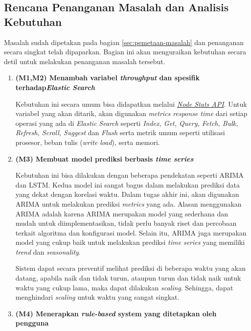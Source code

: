 \subsection{Rencana Penanganan Masalah dan Analisis Kebutuhan}

Masalah sudah dipetakan pada bagian \ref{sec:pemetaan-masalah} dan penanganan secara singkat telah dipaparkan. Bagian ini akan menguraikan kebutuhan secara detil untuk melakukan penanganan masalah tersebut.

\begin{enumerate}
    \item \textbf{(M1,M2) Menambah variabel \textit{throughput} dan spesifik terhadap\textit{Elastic Search}}
    
    Kebutuhan ini secara umum bisa didapatkan melalui \href{https://www.elastic.co/guide/en/elasticsearch/reference/current/cluster-nodes-stats.html}{\textit{Node Stats API}}. Untuk variabel yang akan ditarik, akan digunakan \textit{metrics response time} dari setiap operasi yang ada di \textit{Elastic Search} seperti \textit{Index, Get, Query, Fetch, Bulk, Refresh, Scroll, Suggest} dan \textit{Flush} serta metrik umum seperti utilisasi prosesor, beban tulis (\textit{write load}), serta memori.

    \item \textbf{(M3) Membuat model prediksi berbasis \textit{time series}}
    
    Kebutuhan ini bisa dilakukan dengan beberapa pendekatan seperti ARIMA dan LSTM. Kedua model ini sangat bagus dalam melakukan prediksi data yang dekat dengan korelasi waktu. Dalam tugas akhir ini, akan digunakan ARIMA untuk melakukan prediksi \textit{metrics} yang ada. Alasan menggunakan ARIMA adalah karena ARIMA merupakan model yang sederhana dan mudah untuk diimplementasikan, tidak perlu banyak riset dan percobaan terkait algoritma dan konfigurasi model. Selain itu, ARIMA juga merupakan model yang cukup baik untuk melakukan prediksi \textit{time series} yang memiliki \textit{trend} dan \textit{seasonality}.

    Sistem dapat secara preventif melihat prediksi di beberapa waktu yang akan datang, apabila naik dan tidak turun, ataupun turun dan tidak naik untuk waktu yang cukup lama, maka dapat dilakukan \textit{scaling}. Sehingga, dapat menghindari \textit{scaling} untuk waktu yang sangat singkat.

    \item \textbf{(M4) Menerapkan \textit{rule-based} system yang ditetapkan oleh pengguna}
    

\end{enumerate}
